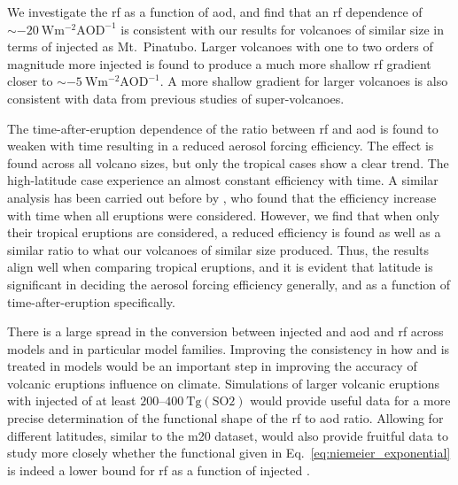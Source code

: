 \documentclass{ametsocV6.1}
\newcommand{\iso}[1][i]{{#1}njected \ce{SO2}}
\begin{document}
We investigate the \gls{rf} as a function of \gls{aod}, and find that an \gls{rf}
dependence of \(\sim\SI{-20}{\watt\metre^{-2}\mathrm{AOD}^{-1}}\) is consistent with our
results for volcanoes of similar size in terms of \iso{} as Mt.\ Pinatubo. Larger
volcanoes with one to two orders of magnitude more \iso{} is found to produce a much
more shallow \gls{rf} gradient closer to \(\sim
\SI{-5}{\watt\metre^{-2}\mathrm{AOD}^{-1}}\). A more shallow gradient for larger
volcanoes is also consistent with data from previous studies of super-volcanoes.

The time-after-eruption dependence of the ratio between \gls{rf} and \gls{aod} is found
to weaken with time resulting in a reduced aerosol forcing efficiency. The effect is
found across all volcano sizes, but only the tropical cases show a clear trend. The
high-latitude case experience an almost constant efficiency with time. A similar
analysis has been carried out before by \citet{marshall2020}, who found that the
efficiency increase with time when all eruptions were considered. However, we find that
when only their tropical eruptions are considered, a reduced efficiency is found as well
as a similar ratio to what our volcanoes of similar size produced. Thus, the results
align well when comparing tropical eruptions, and it is evident that latitude is
significant in deciding the aerosol forcing efficiency generally, and as a function of
time-after-eruption specifically.

There is a large spread in the conversion between \iso{} and \gls{aod} and \gls{rf}
across models and in particular model families. Improving the consistency in how
 and  is treated in models would be an important step in improving the
accuracy of volcanic eruptions influence on climate. Simulations of larger volcanic
eruptions with \iso{} of at least \(200\)--\(\SI{400}{\tera\gram(\mathrm{SO2})}\) would
provide useful data for a more precise determination of the functional shape of the
\gls{rf} to \gls{aod} ratio. Allowing for different latitudes, similar to the \gls{m20}
dataset, would also provide fruitful data to study more closely whether the functional
given in Eq.~\ref{eq:niemeier_exponential} is indeed a lower bound for \gls{rf} as a
function of \iso{}.

\clearpage
\acknowledgments{}
\end{document}
